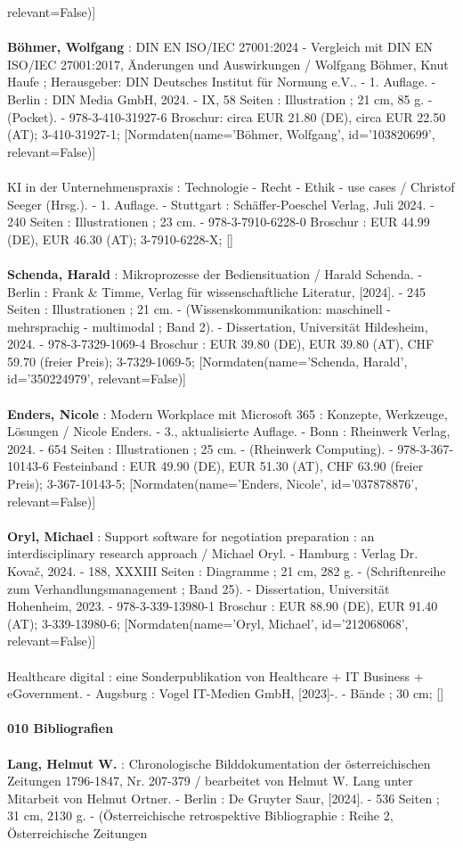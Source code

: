 \documentclass{article}
\begin{document}
\begin{multicols}{3}
relevant=False)]\\\\\textbf{Böhmer, Wolfgang} : DIN EN ISO/IEC 27001:2024 - Vergleich mit DIN EN ISO/IEC 27001:2017, Änderungen und Auswirkungen / Wolfgang Böhmer, Knut Haufe ; Herausgeber: DIN Deutsches Institut für Normung e.V.. - 1. Auflage. - Berlin : DIN Media GmbH, 2024. - IX, 58 Seiten : Illustration ; 21 cm, 85 g. - (Pocket). - 978-3-410-31927-6 Broschur: circa EUR 21.80 (DE), circa EUR 22.50 (AT); 3-410-31927-1; [Normdaten(name='Böhmer, Wolfgang', id='103820699', relevant=False)]\\\\KI in der Unternehmenspraxis : Technologie - Recht - Ethik - use cases / Christof Seeger (Hrsg.). - 1. Auflage. - Stuttgart : Schäffer-Poeschel Verlag, Juli 2024. - 240 Seiten : Illustrationen ; 23 cm. - 978-3-7910-6228-0 Broschur : EUR 44.99 (DE), EUR 46.30 (AT); 3-7910-6228-X; []\\\\\textbf{Schenda, Harald} : Mikroprozesse der Bediensituation / Harald Schenda. - Berlin : Frank \& Timme, Verlag für wissenschaftliche Literatur, [2024]. - 245 Seiten : Illustrationen ; 21 cm. - (Wissenskommunikation: maschinell - mehrsprachig - multimodal ; Band 2). - Dissertation, Universität Hildesheim, 2024. - 978-3-7329-1069-4 Broschur : EUR 39.80 (DE), EUR 39.80 (AT), CHF 59.70 (freier Preis); 3-7329-1069-5; [Normdaten(name='Schenda, Harald', id='350224979', relevant=False)]\\\\\textbf{Enders, Nicole} : Modern Workplace mit Microsoft 365 : Konzepte, Werkzeuge, Lösungen / Nicole Enders. - 3., aktualisierte Auflage. - Bonn : Rheinwerk Verlag, 2024. - 654 Seiten : Illustrationen ; 25 cm. - (Rheinwerk Computing). - 978-3-367-10143-6 Festeinband : EUR 49.90 (DE), EUR 51.30 (AT), CHF 63.90 (freier Preis); 3-367-10143-5; [Normdaten(name='Enders, Nicole', id='037878876', relevant=False)]\\\\\textbf{Oryl, Michael} : Support software for negotiation preparation : an interdisciplinary research approach / Michael Oryl. - Hamburg : Verlag Dr. Kovač, 2024. - 188, XXXIII Seiten : Diagramme ; 21 cm, 282 g. - (Schriftenreihe zum Verhandlungsmanagement ; Band 25). - Dissertation, Universität Hohenheim, 2023. - 978-3-339-13980-1 Broschur : EUR 88.90 (DE), EUR 91.40 (AT); 3-339-13980-6; [Normdaten(name='Oryl, Michael', id='212068068', relevant=False)]\\\\Healthcare digital : eine Sonderpublikation von Healthcare + IT Business + eGovernment. - Augsburg : Vogel IT-Medien GmbH, [2023]-. - Bände ; 30 cm; []\\\\\textbf{010 Bibliografien}\\\\\textbf{Lang, Helmut W.} : Chronologische Bilddokumentation der österreichischen Zeitungen 1796-1847, Nr. 207-379 / bearbeitet von Helmut W. Lang unter Mitarbeit von Helmut Ortner. - Berlin : De Gruyter Saur, [2024]. - 536 Seiten ; 31 cm, 2130 g. - (Österreichische retrospektive Bibliographie : Reihe 2, Österreichische Zeitungen 
\end{multicols}
\end{document}

